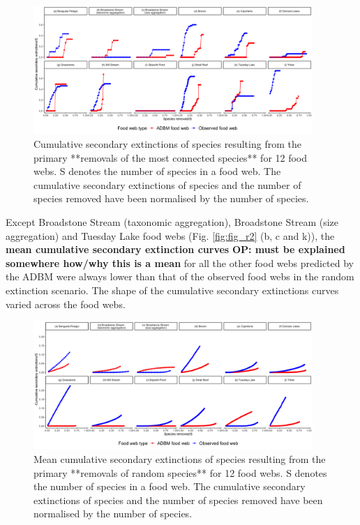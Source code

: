 \documentclass{article}
\begin{document}
\begin{figure}

{\centering \includegraphics[width=400px]{../results/plot_mostconnected} 

}

\caption{\label{fig:fig_r1} Cumulative secondary extinctions of species resulting from the primary **removals of the most connected species** for 12 food webs. S denotes the number of species in a food web. The cumulative secondary extinctions of species and the number of species removed have been normalised by the number of species.}\label{fig:unnamed-chunk-2}
\end{figure}

Except Broadstone Stream (taxonomic aggregation), Broadstone Stream
(size aggregation) and Tuesday Lake food webs (Fig. \ref{fig:fig_r2} (b,
c and k)), the \textbf{mean cumulative secondary extinction curves}
\textbf{OP: must be explained somewhere how/why this is a mean} for all
the other food webs predicted by the ADBM were always lower than that of
the observed food webs in the random extinction scenario. The shape of
the cumulative secondary extinctions curves varied across the food webs.

\begin{figure}

{\centering \includegraphics[width=400px]{../results/plot_random} 

}

\caption{\label{fig:fig_r2} Mean cumulative secondary extinctions of species resulting from the primary **removals of random species** for 12 food webs. S denotes the number of species in a food web. The cumulative secondary extinctions of species and the number of species removed have been normalised by the number of species.}\label{fig:unnamed-chunk-3}
\end{figure}
\end{document}
